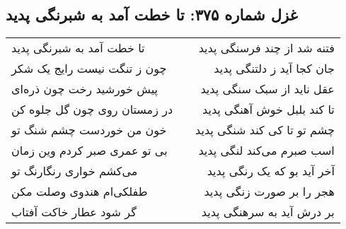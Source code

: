 \begin{center}
\section*{غزل شماره ۳۷۵: تا خطت آمد به شبرنگی پدید}
\label{sec:375}
\begin{longtable}{l p{0.5cm} r}
تا خطت آمد به شبرنگی پدید
&&
فتنه شد از چند فرسنگی پدید
\\
چون ز تنگت نیست رایج یک شکر
&&
جان کجا آید ز دلتنگی پدید
\\
پیش خورشید رخت چون ذره‌ای
&&
عقل ناید از سبک سنگی پدید
\\
در زمستان روی چون گل جلوه کن
&&
تا کند بلبل خوش آهنگی پدید
\\
خون من خوردست چشم شنگ تو
&&
چشم تو تا کی کند شنگی پدید
\\
بی تو عمری صبر کردم وین زمان
&&
اسب صبرم می‌کند لنگی پدید
\\
می‌کشم خواری رنگارنگ تو
&&
آخر آید بو که یک رنگی پدید
\\
طفلکی‌ام هندوی وصلت مکن
&&
هجر را بر صورت زنگی پدید
\\
گر شود عطار خاکت آفتاب
&&
بر درش آید به سرهنگی پدید
\\
\end{longtable}
\end{center}

